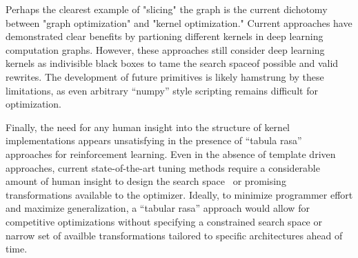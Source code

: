 Perhaps the clearest example of "slicing" the graph is the current dichotomy between "graph optimization" and "kernel optimization."
Current approaches have demonstrated clear benefits by partioning different kernels in deep learning computation graphs.
However, these approaches still consider deep learning kernels as indivisible black boxes to tame the search spaceof possible and valid rewrites.
The development of future primitives is likely hamstrung by these limitations, as even arbitrary ``numpy'' style scripting remains difficult for optimization.

Finally, the need for any human insight into the structure of kernel implementations appears unsatisfying in the presence of ``tabula rasa''~\cite{silver2017mastering} approaches for reinforcement learning.
Even in the absence of template driven approaches, current state-of-the-art tuning methods require a considerable amount of human insight to design the search space~\cite{zheng2020ansor} or promising transformations available to the optimizer.
Ideally, to minimize programmer effort and maximize generalization, a ``tabular rasa'' approach would allow for competitive optimizations without specifying a constrained search space or narrow set of availble transformations tailored to specific architectures ahead of time.
